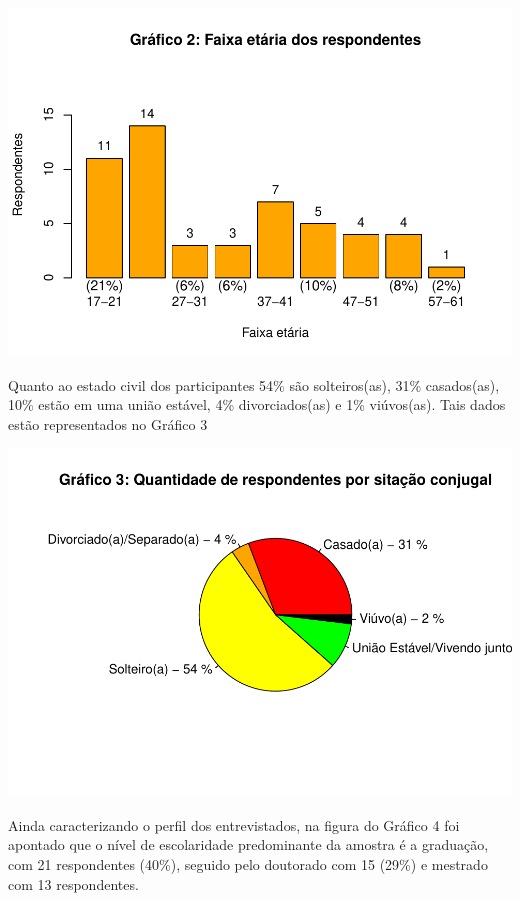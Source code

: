 \documentclass[
]{article}
\begin{document}
\includegraphics{consequencias-oriundas-da-pandemia-v1.0_files/figure-latex/grafico-2-1.pdf}

Quanto ao estado civil dos participantes 54\% são solteiros(as), 31\%
casados(as), 10\% estão em uma união estável, 4\% divorciados(as) e 1\%
viúvos(as). Tais dados estão representados no Gráfico 3

\includegraphics{consequencias-oriundas-da-pandemia-v1.0_files/figure-latex/grafico-3-1.pdf}

Ainda caracterizando o perfil dos entrevistados, na figura do Gráfico 4
foi apontado que o nível de escolaridade predominante da amostra é a
graduação, com 21 respondentes (40\%), seguido pelo doutorado com 15
(29\%) e mestrado com 13 respondentes.
\end{document}
